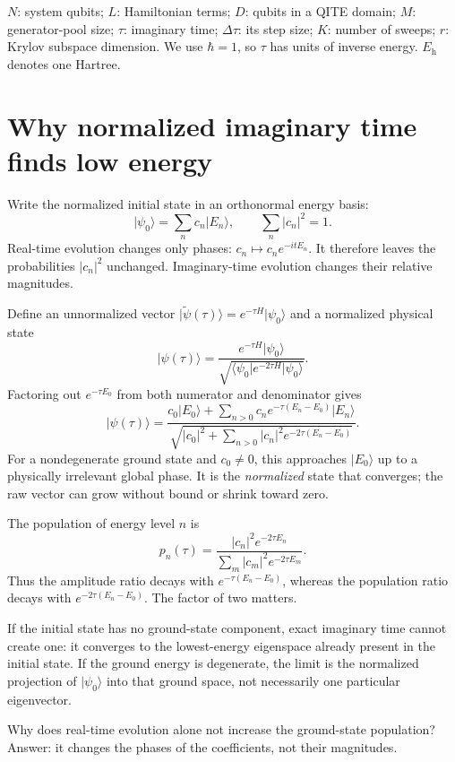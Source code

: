 \documentclass[11pt,a4paper]{article}
\newcommand{\ket}[1]{\lvert #1\rangle}
\newcommand{\bra}[1]{\langle #1\rvert}
\newcommand{\dt}{\Delta\tau}
\newcommand{\Eh}{E_{\mathrm h}}
\newcommand{\lesson}[2]{\clearpage\section{#1}\label{#2}}
\newcommand{\checkpoint}[1]{\begin{idea}[Pause and check]#1\end{idea}}
\begin{document}
\begin{idea}
$N$: system qubits; $L$: Hamiltonian terms; $D$: qubits in a QITE domain; $M$: generator-pool size; $\tau$: imaginary time; $\dt$: its step size; $K$: number of sweeps; $r$: Krylov subspace dimension. We use $\hbar=1$, so $\tau$ has units of inverse energy. $\Eh$ denotes one Hartree.
\end{idea}

\lesson{Why normalized imaginary time finds low energy}{sec:filter}
Write the normalized initial state in an orthonormal energy basis:
\[
\ket{\psi_0}=\sum_n c_n\ket{E_n},\qquad \sum_n|c_n|^2=1.
\]
Real-time evolution changes only phases: $c_n\mapsto c_ne^{-itE_n}$. It therefore leaves the probabilities $|c_n|^2$ unchanged. Imaginary-time evolution changes their relative magnitudes.

Define an unnormalized vector $\ket{\widetilde\psi(\tau)}=e^{-\tau H}\ket{\psi_0}$ and a normalized physical state
\begin{equation}
\boxed{\ket{\psi(\tau)}=
\frac{e^{-\tau H}\ket{\psi_0}}
{\sqrt{\bra{\psi_0}e^{-2\tau H}\ket{\psi_0}}}.}
\label{eq:normalized}
\end{equation}
Factoring out $e^{-\tau E_0}$ from both numerator and denominator gives
\[
\ket{\psi(\tau)}=
\frac{c_0\ket{E_0}+\sum_{n>0}c_ne^{-\tau(E_n-E_0)}\ket{E_n}}
{\sqrt{|c_0|^2+\sum_{n>0}|c_n|^2e^{-2\tau(E_n-E_0)}}}.
\]
For a nondegenerate ground state and $c_0\ne0$, this approaches $\ket{E_0}$ up to a physically irrelevant global phase. It is the \emph{normalized} state that converges; the raw vector can grow without bound or shrink toward zero.

The population of energy level $n$ is
\[
p_n(\tau)=\frac{|c_n|^2e^{-2\tau E_n}}{\sum_m |c_m|^2e^{-2\tau E_m}}.
\]
Thus the amplitude ratio decays with $e^{-\tau(E_n-E_0)}$, whereas the population ratio decays with $e^{-2\tau(E_n-E_0)}$. The factor of two matters.

\begin{caution}
If the initial state has no ground-state component, exact imaginary time cannot create one: it converges to the lowest-energy eigenspace already present in the initial state. If the ground energy is degenerate, the limit is the normalized projection of $\ket{\psi_0}$ into that ground space, not necessarily one particular eigenvector.
\end{caution}

\checkpoint{Why does real-time evolution alone not increase the ground-state population? Answer: it changes the phases of the coefficients, not their magnitudes.}
\end{document}
